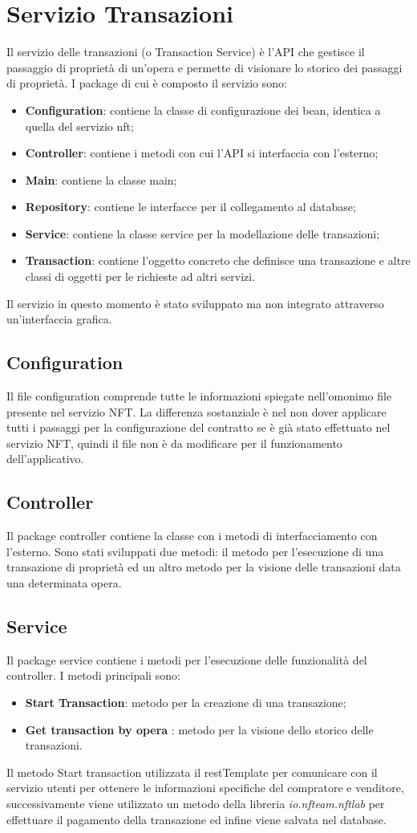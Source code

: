 \section{Servizio Transazioni} 
Il servizio delle transazioni (o Transaction Service) è l'API che gestisce il passaggio di proprietà di un'opera e permette di visionare lo storico dei passaggi di proprietà. I package di cui è composto il servizio sono:
\begin{itemize}
	\item \textbf{Configuration}: contiene la classe di configurazione dei bean, identica a quella del servizio nft;
	\item \textbf{Controller}: contiene i metodi con cui l'API si interfaccia con l'esterno;
	\item \textbf{Main}: contiene la classe main;
	\item \textbf{Repository}: contiene le interfacce per il collegamento al database;
	\item \textbf{Service}: contiene la classe service per la modellazione delle transazioni;
	\item \textbf{Transaction}: contiene l'oggetto concreto che definisce una transazione e altre classi di oggetti per le richieste ad altri servizi.
\end{itemize}
Il servizio in questo momento è stato sviluppato ma non integrato attraverso un'interfaccia grafica.
\subsection{Configuration}
Il file configuration comprende tutte le informazioni spiegate nell'omonimo file presente nel servizio NFT. La differenza sostanziale è nel non dover applicare tutti i passaggi per la configurazione del contratto se è già stato effettuato nel servizio NFT, quindi il file non è da modificare per il funzionamento dell'applicativo.
\subsection{Controller}
Il package controller contiene la classe con i metodi di interfacciamento con l'esterno. Sono stati sviluppati due metodi: il metodo per l'esecuzione di una transazione di proprietà ed un altro metodo per la visione delle transazioni data una determinata opera. 
\subsection{Service}
Il package service contiene i metodi per l'esecuzione delle funzionalità del controller. I metodi principali sono:
\begin{itemize}
	\item \textbf{Start Transaction}: metodo per la creazione di una transazione;
	\item \textbf{Get transaction by opera }: metodo per la visione dello storico delle transazioni.
\end{itemize}
Il metodo Start transaction utilizzata il restTemplate per comunicare con il servizio utenti per ottenere le informazioni specifiche del compratore e venditore, successivamente viene utilizzato un metodo della libreria \emph{io.nfteam.nftlab} per effettuare il pagamento della transazione ed infine viene salvata nel database.
